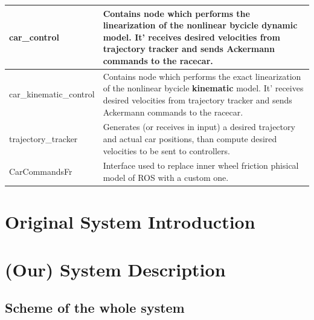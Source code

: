 \documentclass[12pt, letterpaper]{report}
\begin{document}
\begin{center}
	\begin{tabularx}{\textwidth}{
			| >{\raggedright\arraybackslash}X
			| >{\raggedright\arraybackslash}X |
		}
		\hline
		car\_control & Contains node which performs the linearization of the nonlinear bycicle \textbf{dynamic} model. It' receives desired velocities from trajectory tracker and sends Ackermann commands to the racecar. \\
		\hline
		car\_kinematic\_control & Contains node which performs the exact linearization of the nonlinear bycicle \textbf{kinematic} model. It' receives desired velocities from trajectory tracker and sends Ackermann commands to the racecar. \\
		\hline
		trajectory\_tracker & Generates (or receives in input) a desired trajectory and actual car positions, than compute desired velocities to be sent to controllers. \\
		\hline
		CarCommandsFr & Interface used to replace inner wheel friction phisical model of ROS with a custom one. \\
		\hline
	\end{tabularx}
\end{center}

\chapter{Original System Introduction}

\chapter{(Our) System Description}

\section{Scheme of the whole system}
\end{document}
